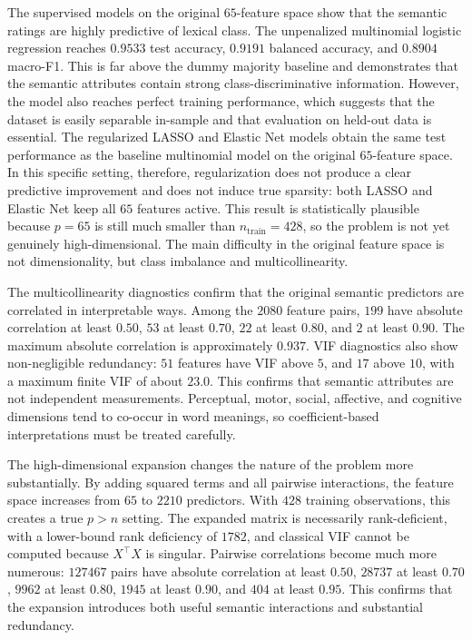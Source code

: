 \documentclass{ipgpmaster}
\begin{document}
The supervised models on the original \(65\)-feature space show that the semantic ratings are highly predictive of lexical class. The unpenalized multinomial logistic regression reaches \(0.9533\) test accuracy, \(0.9191\) balanced accuracy, and \(0.8904\) macro-F1. This is far above the dummy majority baseline and demonstrates that the semantic attributes contain strong class-discriminative information. However, the model also reaches perfect training performance, which suggests that the dataset is easily separable in-sample and that evaluation on held-out data is essential. The regularized LASSO and Elastic Net models obtain the same test performance as the baseline multinomial model on the original \(65\)-feature space. In this specific setting, therefore, regularization does not produce a clear predictive improvement and does not induce true sparsity: both LASSO and Elastic Net keep all \(65\) features active. This result is statistically plausible because \(p=65\) is still much smaller than \(n_{\text{train}}=428\), so the problem is not yet genuinely high-dimensional. The main difficulty in the original feature space is not dimensionality, but class imbalance and multicollinearity.

The multicollinearity diagnostics confirm that the original semantic predictors are correlated in interpretable ways. Among the \(2080\) feature pairs, \(199\) have absolute correlation at least \(0.50\), \(53\) at least \(0.70\), \(22\) at least \(0.80\), and \(2\) at least \(0.90\). The maximum absolute correlation is approximately \(0.937\). VIF diagnostics also show non-negligible redundancy: \(51\) features have VIF above \(5\), and \(17\) above \(10\), with a maximum finite VIF of about \(23.0\). This confirms that semantic attributes are not independent measurements. Perceptual, motor, social, affective, and cognitive dimensions tend to co-occur in word meanings, so coefficient-based interpretations must be treated carefully.

The high-dimensional expansion changes the nature of the problem more substantially. By adding squared terms and all pairwise interactions, the feature space increases from \(65\) to \(2210\) predictors. With \(428\) training observations, this creates a true \(p>n\) setting. The expanded matrix is necessarily rank-deficient, with a lower-bound rank deficiency of \(1782\), and classical VIF cannot be computed because \(X^\top X\) is singular. Pairwise correlations become much more numerous: \(127467\) pairs have absolute correlation at least \(0.50\), \(28737\) at least \(0.70\), \(9962\) at least \(0.80\), \(1945\) at least \(0.90\), and \(404\) at least \(0.95\). This confirms that the expansion introduces both useful semantic interactions and substantial redundancy.
\end{document}
